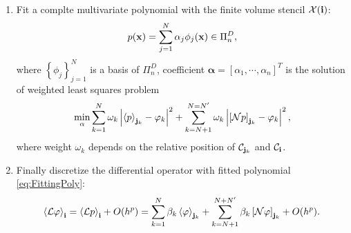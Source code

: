 \begin{enumerate}
\item Fit a complte multivariate polynomial with the finite volume
  stencil $\mathcal{X}({\mathbf{i}})$:
  \begin{equation}
    \label{eq:FittingPoly}
    p({\mathbf{x}})=\sum\limits_{j=1}^N \alpha_j\phi_j({\mathbf{x}})\in\Pi_n^D,
  \end{equation}
  where $\left\{\phi_j\right\}_{j=1}^N$ is a basis of $\Pi_n^D$,
  coefficient $\mathbf{\alpha} = [\alpha_1,\cdots,\alpha_n]^T$ is the
  solution of weighted least squares problem
  \begin{equation}
    \label{eq:WeightedLSP}
    \min_{\alpha}\sum_{k=1}^N\omega_k\left|\left<p\right>_{{\mathbf{j}}_k} -
      \varphi_k\right|^2 +
    \sum_{k=N+1}^{N=N'}\omega_k\left|\left[\mathcal{N}p\right]_{{\mathbf{j}}_k} -
    \varphi_k\right|^2,
  \end{equation}
  where weight $\omega_k$ depends on the relative position of
  $\mathcal{C}_{{\mathbf{j}}_k}$ and $\mathcal{C}_{{\mathbf{i}}}$.
\item Finally discretize the differential operator with fitted
  polynomial \eqref{eq:FittingPoly}:
  \begin{equation}
    \label{eq:DiscreteOp}
    \left<\mathcal{L}\varphi\right>_{{\mathbf{i}}} =
    \left<\mathcal{L}p\right>_{{\mathbf{i}}}  + O(h^p) =
    \sum_{k=1}^N\beta_k\left<\varphi\right>_{{\mathbf{j}}_k}+
    \sum_{k=N+1}^{N+N'}\beta_k\left[\mathcal{N}\varphi\right]_{{\mathbf{j}}_k} + O(h^p).
  \end{equation}
\end{enumerate}

